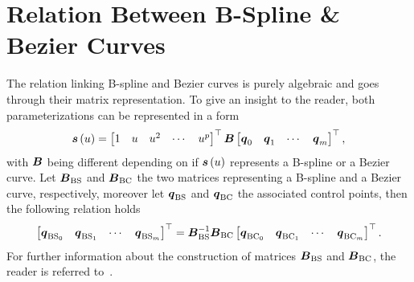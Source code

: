 \section{Relation Between B-Spline \& B\acuteacc ezier Curves}
The relation linking B-spline and B\acuteacc ezier curves is purely algebraic and goes through their matrix representation.
To give an insight to the reader, both parameterizations can be represented in a form 
\begin{equation*}
   \boldsymbol{s} \left( u \right) =
    \begin{bmatrix}
        1 & u & u^2 & \cdots & u^{p}
    \end{bmatrix}^{\top}
    \boldsymbol{B}
    \begin{bmatrix}
        \boldsymbol{q}_0 & \boldsymbol{q}_1 & \cdots & \boldsymbol{q}_{m}
    \end{bmatrix}^{\top},
\end{equation*}
with $\boldsymbol{B}$ being different depending on if $\boldsymbol{s}\left( u \right)$ represents a B-spline or a B\acuteacc ezier curve.
Let $\boldsymbol{B}_{\text{BS}}$ and $\boldsymbol{B}_{\text{BC}}$ the two matrices representing a B-spline and a B\acuteacc ezier curve,
respectively, moreover let $\boldsymbol{q}_{\text{BS}}$ and $\boldsymbol{q}_{\text{BC}}$ the associated control points, then
the following relation holds
\begin{equation*}
    \begin{bmatrix}
        \boldsymbol{q}_{\text{BS}_0} & \boldsymbol{q}_{\text{BS}_1} & \cdots & \boldsymbol{q}_{\text{BS}_{m}}
    \end{bmatrix}^{\top} = 
    \boldsymbol{B}_{\text{BS}}^{-1}
    \boldsymbol{B}_{\text{BC}}
    \begin{bmatrix}
        \boldsymbol{q}_{\text{BC}_0} & \boldsymbol{q}_{\text{BC}_1} & \cdots & \boldsymbol{q}_{\text{BC}_{m}}
    \end{bmatrix}^{\top}.
\end{equation*}
For further information about the construction of matrices $\boldsymbol{B}_{\text{BS}}$ and $\boldsymbol{B}_{\text{BC}}$, the reader is referred
to~\cite*{qin1998general}.
